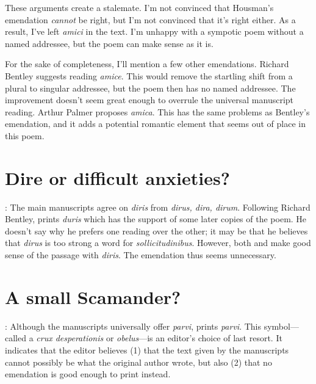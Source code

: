 These arguments create a stalemate.  I'm not convinced that Housman's emendation \textit{cannot} be right, but I'm not convinced that it's right either.  As a result, I've left \textit{amici} in the text.  I'm unhappy with a sympotic poem without a named addressee, but the poem can make sense as it is.

For the sake of completeness, I'll mention a few other emendations.  Richard Bentley suggests reading \textit{amice}.  This would remove the startling shift from a plural to singular addressee, but the poem then has no named addressee.  The improvement doesn't seem great enough to overrule the universal manuscript reading.  Arthur Palmer proposes \textit{amica}.  This has the same problems as Bentley's emendation, and it adds a potential romantic element that seems out of place in this poem.


\section*{Dire or difficult anxieties?}


: The main manuscripts agree on \textit{diris} from \textit{dirus, dira, dirum}.  Following Richard Bentley, \citet{sb1985}  prints \textit{duris} which has the support of some later copies of the poem.  He doesn't say why he prefers one reading over the other; it may be that he believes that \textit{dirus} is too strong a word for \textit{sollicitudinibus}.  However, both \citet[220]{mankin1995} and \citet[430]{watson2003} make good sense of the passage with \textit{diris}.  The emendation thus seems unnecessary.


\section*{A small Scamander?}


: Although the manuscripts universally offer \textit{parvi}, \citet{sb1985} prints \textit{\dag parvi\dag}.  This symbol---called a \textit{crux desperationis} or \textit{obelus}---is an editor's choice of last resort.  It indicates that the editor believes (1) that the text given by the manuscripts cannot possibly be what the original author wrote, but also (2) that no emendation is good enough to print instead.

